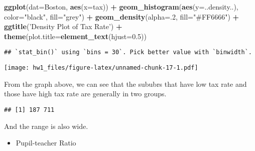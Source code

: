 \documentclass[]{article}
\newenvironment{Shaded}{\begin{snugshade}}{\end{snugshade}}
\newcommand{\DataTypeTok}[1]{\textcolor[rgb]{0.13,0.29,0.53}{#1}}
\newcommand{\DecValTok}[1]{\textcolor[rgb]{0.00,0.00,0.81}{#1}}
\newcommand{\FloatTok}[1]{\textcolor[rgb]{0.00,0.00,0.81}{#1}}
\newcommand{\KeywordTok}[1]{\textcolor[rgb]{0.13,0.29,0.53}{\textbf{#1}}}
\newcommand{\NormalTok}[1]{#1}
\newcommand{\OperatorTok}[1]{\textcolor[rgb]{0.81,0.36,0.00}{\textbf{#1}}}
\newcommand{\StringTok}[1]{\textcolor[rgb]{0.31,0.60,0.02}{#1}}
\providecommand{\tightlist}{%
  \setlength{\itemsep}{0pt}\setlength{\parskip}{0pt}}
\begin{document}
\begin{Shaded}
\begin{Highlighting}[]
\KeywordTok{ggplot}\NormalTok{(}\DataTypeTok{dat=}\NormalTok{Boston, }\KeywordTok{aes}\NormalTok{(}\DataTypeTok{x=}\NormalTok{tax)) }\OperatorTok{+}\StringTok{ }\KeywordTok{geom_histogram}\NormalTok{(}\KeywordTok{aes}\NormalTok{(}\DataTypeTok{y=}\NormalTok{..density..), }\DataTypeTok{color=}\StringTok{"black"}\NormalTok{, }\DataTypeTok{fill=}\StringTok{"grey"}\NormalTok{) }\OperatorTok{+}\StringTok{ }\KeywordTok{geom_density}\NormalTok{(}\DataTypeTok{alpha=}\NormalTok{.}\DecValTok{2}\NormalTok{, }\DataTypeTok{fill=}\StringTok{"#FF6666"}\NormalTok{) }\OperatorTok{+}\StringTok{ }\KeywordTok{ggtitle}\NormalTok{(}\StringTok{'Density Plot of Tax Rate'}\NormalTok{) }\OperatorTok{+}\StringTok{ }\KeywordTok{theme}\NormalTok{(}\DataTypeTok{plot.title=}\KeywordTok{element_text}\NormalTok{(}\DataTypeTok{hjust=}\FloatTok{0.5}\NormalTok{))}
\end{Highlighting}
\end{Shaded}

\begin{verbatim}
## `stat_bin()` using `bins = 30`. Pick better value with `binwidth`.
\end{verbatim}

\texttt{[image: hw1\_files/figure-latex/unnamed-chunk-17-1.pdf]}

From the graph above, we can see that the sububrs that have low tax rate
and those have high tax rate are generally in two groups.

\begin{Shaded}
\end{Shaded}

\begin{verbatim}
## [1] 187 711
\end{verbatim}

And the range is also wide.

\begin{itemize}
\tightlist
\item
  Pupil-teacher Ratio
\end{itemize}
\end{document}
